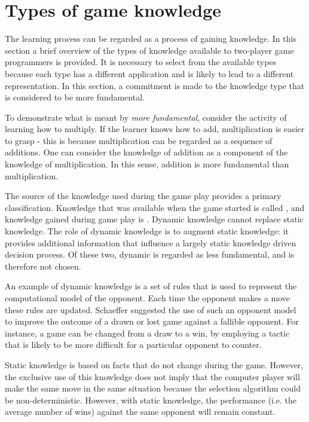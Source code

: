 \section{Types of game knowledge}
\label{sec:knowledge-types}
The learning process can be regarded as a process of gaining knowledge. In this section a brief overview of the types of knowledge available to two-player game programmers is provided. It is necessary to select from the available types because each type has a different application and is likely to lead to a different representation.  In this section,  a commitment is made to the knowledge type that is considered to be more fundamental.  

To demonstrate what is meant by {\it more fundamental}, consider the activity of learning how to multiply. If the learner knows how to add, multiplication is easier to grasp - this is  because multiplication can be regarded as a sequence of additions. One can consider the knowledge of addition as a component of the knowledge of multiplication.  In this sense, addition is more fundamental than multiplication.  

The source of the knowledge used during the game play provides a primary classification. Knowledge that was available when the game started is called , and knowledge gained during game play is .  Dynamic knowledge cannot replace static knowledge.  The role of dynamic knowledge is to augment static knowledge: it provides additional information that influence a largely static knowledge driven decision process.  Of these two, dynamic is regarded as less fundamental, and is therefore not chosen.

An example of dynamic knowledge is a set of rules that is used to represent the computational model of the opponent.  Each time the opponent makes a move these rules are updated. Schaeffer \cite{schaeffer:reexamination} suggested the use of such an opponent model to improve the outcome of a drawn or lost game against a fallible opponent.  For instance, a game can be changed from a draw to a win, by employing a tactic that is likely to be more difficult for a particular opponent to counter.  

Static knowledge  is based on facts that do not change during the game.  However, the exclusive use of this knowledge does not imply that the computer player will make the same move in the same situation because the selection algorithm  could be non-deterministic.  However, with static knowledge, the performance (i.e. the average number of wins) against the same opponent will remain constant.  


